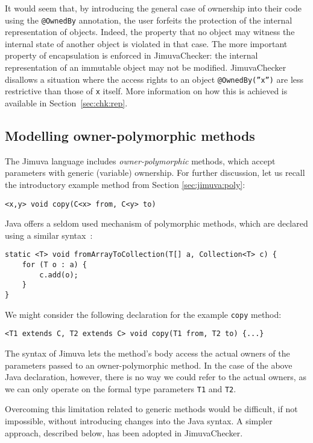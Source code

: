 \documentclass{pracamgr}
\theoremstyle{break}
\theoremstyle{break}
\theoremstyle{break}
\begin{document}
It would seem that, by introducing the general case of ownership into
their code using the \texttt{@OwnedBy} annotation, the user forfeits
the protection of the internal representation of objects. Indeed, the
property that no object may witness the internal state of another
object is violated in that case. The more important property of
encapsulation is enforced in JimuvaChecker: the internal
representation of an immutable object may not be
modified. JimuvaChecker disallows a situation where the access rights
to an object \texttt{@OwnedBy(''x'')} are less restrictive than those
of \texttt{x} itself. More information on how this is achieved is
available in Section~\ref{sec:chk:rep}.

\subsection{Modelling owner-polymorphic methods}
\label{sec:mod:poly}

The Jimuva language includes \emph{owner-polymorphic} methods, which
accept parameters with generic (variable) ownership. For further
discussion, let us recall the introductory example method from Section
\ref{sec:jimuva:poly}:
\begin{center}
  \texttt{<x,y> void copy(C<x> from, C<y> to)}
\end{center}

Java offers a seldom used mechanism of polymorphic methods, which are
declared using a similar syntax~\cite{genericmethods}:
\begin{lstlisting}
static <T> void fromArrayToCollection(T[] a, Collection<T> c) {
    for (T o : a) {
        c.add(o);
    }
}
\end{lstlisting}

We might consider the following declaration for the example
\texttt{copy} method:
\begin{lstlisting}
<T1 extends C, T2 extends C> void copy(T1 from, T2 to) {...}
\end{lstlisting}
The syntax of Jimuva lets the method's body access the actual owners
of the parameters passed to an owner-polymorphic method. In the case
of the above Java declaration, however, there is no way we could refer
to the actual owners, as we can only operate on the formal type
parameters \texttt{T1} and \texttt{T2}.

Overcoming this limitation related to generic methods would be
difficult, if not impossible, without introducing changes into the
Java syntax. A simpler approach, described below, has been adopted in
JimuvaChecker.
\end{document}
